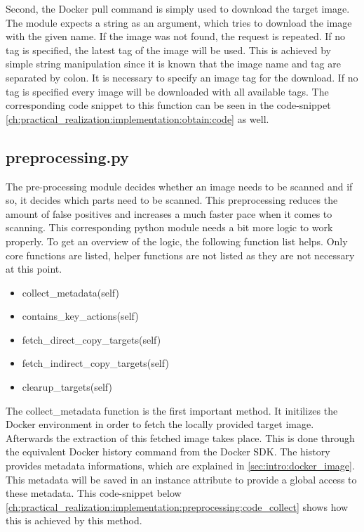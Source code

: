Second, the Docker pull command is simply used to download the target image. The module expects a string as an argument, which tries to download the image with the given name.	
If the image was not found, the request is repeated. 
If no tag is specified, the latest tag of the image will be used. This is achieved by simple string manipulation since it is known that the image name and tag are separated by colon.
It is necessary to specify an image tag for the download. If no tag is specified every image will be downloaded with all available tags. The corresponding code snippet to this function can be seen in the code-snippet \ref{ch:practical_realization:implementation:obtain:code} as well.


\subsection{preprocessing.py}
\label{ch:practical_realization:implementation:preprocessing}
The pre-processing module decides whether an image needs to be scanned and if so, it decides which parts need to be scanned. This preprocessing reduces the amount of false positives and increases a much faster pace when it comes to scanning.
This corresponding python module needs a bit more logic to work properly. To get an overview of the logic, the following function list helps. Only core functions are listed, helper functions are not listed as they are not necessary at this point.
\begin{itemize}
\item collect\_metadata(self)
\item contains\_key\_actions(self)
\item fetch\_direct\_copy\_targets(self)
\item fetch\_indirect\_copy\_targets(self)
\item clearup\_targets(self)
\end{itemize}

The collect\_metadata function is the first important method. It initilizes the Docker environment in order to fetch the locally provided target image. Afterwards the extraction of this fetched image takes place. This is done through the equivalent Docker history command from the Docker SDK. The history provides metadata informations, which are explained in \ref{sec:intro:docker_image}. This metadata will be saved in an instance attribute to provide a global access to these metadata. This code-snippet below \ref{ch:practical_realization:implementation:preprocessing:code_collect} shows how this is achieved by this method. 


